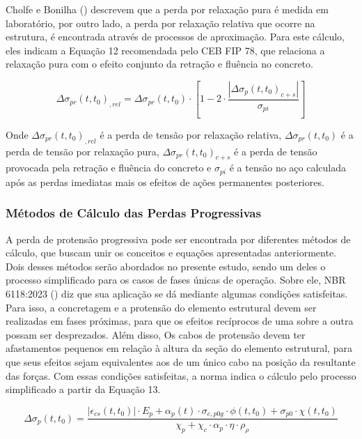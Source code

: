 Cholfe e Bonilha (\citeyear{CB}) descrevem que a perda por relaxação pura é medida em laboratório, por outro lado, a perda por relaxação relativa que ocorre na estrutura, é encontrada através de processos de aproximação. Para este cálculo, eles indicam a Equação 12 recomendada pelo CEB FIP 78, que relaciona a relaxação pura com o efeito conjunto da retração e fluência no concreto.\bigskip

\begin{equation}
\Delta\sigma_{pr}(t,t_0)_{,rel} = \Delta\sigma_{pr}(t,t_0) \cdot [1 - 2 \cdot \frac{|\Delta\sigma_{p}(t,t_0)_{c+s}|}{\sigma_{pi}}]
\end{equation}\bigskip

Onde $\Delta\sigma_{pr}(t,t_0)_{,rel}$ é a perda de tensão por relaxação relativa, $\Delta\sigma_{pr}(t,t_0)$ é a perda de tensão por relaxação pura, $\Delta\sigma_{pr}(t,t_0)_{c+s}$ é a perda de tensão provocada pela retração e fluência do concreto e $\sigma_{pi}$ é a tensão no aço calculada após as perdas imediatas mais os efeitos de ações permanentes posteriores.

\subsubsection{Métodos de Cálculo das Perdas Progressivas}

\hspace{0.4cm}A perda de protensão progressiva pode ser encontrada por diferentes métodos de cálculo, que buscam unir os conceitos e equações apresentadas anteriormente. Dois desses métodos serão abordados no presente estudo, sendo um deles o processo simplificado para os casos de fases únicas de operação. Sobre ele, NBR 6118:2023 (\citeyear{NOAB}) diz que sua aplicação se dá mediante algumas condições satisfeitas. Para isso, a concretagem e a protensão do elemento estrutural devem ser realizadas em fases próximas, para que os efeitos recíprocos de uma sobre a outra possam ser desprezados. Além disso, Os cabos de protensão devem ter afastamentos pequenos em relação à altura da seção do elemento estrutural, para que seus efeitos sejam equivalentes aos de um único cabo na posição da resultante das forças. Com essas condições satisfeitas, a norma indica o cálculo pelo processo simplificado a partir da Equação 13.\bigskip

\begin{equation}
\Delta\sigma_{p}(t,t_0) = \frac{|\epsilon_{cs}(t,t_0)| \cdot E_p + \alpha_p(t) \cdot \sigma_{c,p0g} \cdot \phi(t,t_0) + \sigma_{p0} \cdot \chi(t,t_0)}{\chi_p + \chi_c \cdot \alpha_p \cdot \eta \cdot \rho_\rho}
\end{equation}\bigskip

